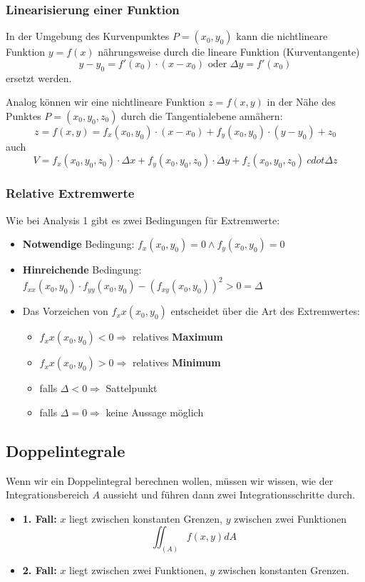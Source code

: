 \subsubsection{Linearisierung einer Funktion}
\begin{definition}
In der Umgebung des Kurvenpunktes $P=(x_0,y_0)$ kann die nichtlineare Funktion $y=f(x)$ nährungsweise durch die lineare Funktion (Kurventangente)
$$y -y_0 = f'(x_0) \cdot (x - x_0) \text{ oder } \Delta y = f'(x_0)$$
ersetzt werden. 

Analog können wir eine nichtlineare Funktion $z=f(x,y)$ in der Nähe des Punktes $P=(x_0, y_0, z_0)$ durch die Tangentialebene annähern:
$$z=f(x,y) = f_x(x_0, y_0) \cdot (x-x_0) + f_y(x_0, y_0) \cdot (y-y_0) + z_0$$
auch 
$$ V= f_x(x_0, y_0, z_0) \cdot \Delta x + f_y(x_0, y_0, z_0) \cdot \Delta y + f_z(x_0, y_0, z_0) \ cdot \Delta z$$
\end{definition}

\subsubsection{Relative Extremwerte}
\begin{definition}
Wie bei Analysis 1 gibt es zwei Bedingungen für Extremwerte:
\begin{itemize}
	\item \textbf{Notwendige} Bedingung: $f_x(x_0, y_0) = 0 \wedge f_y(x_0, y_0) = 0$
	\item \textbf{Hinreichende} Bedingung: $f_{xx}(x_0, y_0) \cdot f_{yy}(x_0, y_0)  - (f_{xy}(x_0, y_0))^2 > 0 = \Delta$
	\item  Das Vorzeichen von \textbf{$f_xx(x_0, y_0)$} entscheidet über die Art des Extremwertes:
	\begin{itemize}
		\item $f_xx(x_0, y_0) < 0 \Rightarrow $ relatives \textbf{Maximum}
		\item $f_xx(x_0, y_0) > 0 \Rightarrow $ relatives \textbf{Minimum}
		\item falls $\Delta < 0 \Rightarrow$ Sattelpunkt
		\item falls $\Delta = 0 \Rightarrow$ keine Aussage möglich
		\end{itemize}
\end{itemize}
\end{definition}

\subsection{Doppelintegrale}
Wenn wir ein Doppelintegral berechnen wollen, müssen wir wissen, wie der Integrationsbereich $A$ aussieht und führen dann zwei Integrationsschritte durch.

\begin{itemize}
	\item \textbf{1. Fall:} $x$ liegt zwischen konstanten Grenzen, $y$ zwischen zwei Funktionen
	$$ \iint_{(A)} f(x,y) dA$$ 
	\item \textbf{2. Fall:} $x$ liegt zwischen zwei Funktionen, $y$ zwischen konstanten Grenzen.
\end{itemize}
